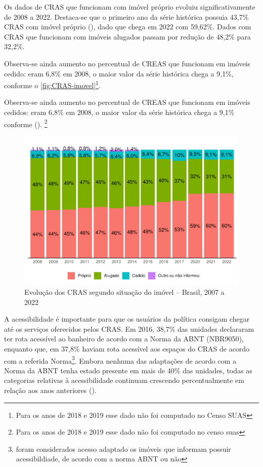 \documentclass[
  brazilian]{report}
\begin{document}
Os dados de CRAS que funcionam com imóvel próprio evoluiu
significativamente de 2008 a 2022. Destaca-se que o primeiro ano da
série histórica possuia 43,7\% CRAS com imóvel próprio
(), dado que chega em 2022 com 59,62\%. Dados com
CRAS que funcionam com imóveis alugados passam por redução de 48,2\%
para 32,2\%.

Observa-se ainda aumento no percentual de CREAS que funcionam em imóveis
cedido: eram 6,8\% em 2008, o maior valor da série histórica chega a
9,1\%, conforme o
\cref{fig:CRAS-imovel}\footnote{Para os anos de 2018 e 2019 esse dado não foi computado no Censo SUAS}.

Observa-se ainda aumento no percentual de CREAS que funcionam em imóveis
cedidos: eram 6,8\% em 2008, o maior valor da série histórica chega a
9,1\% conforme ().
\footnote{Para os anos de 2018 e 2019 esse dado não foi computado no censo suas}

\begin{figure}
\includegraphics{Censo-SUAS-2022_files/figure-latex/sit_imovel-1} \caption[Evolução dos CRAS segundo situação do imóvel – Brasil, 2007 a 2022]{Evolução dos CRAS segundo situação do imóvel – Brasil, 2007 a 2022}\label{fig:sit_imovel}
\end{figure}

A acessibilidade é importante para que os usuários da política consigam
chegar até os serviços oferecidos pelos CRAS. Em 2016, 38,7\% das
unidades declararam ter rota acessível ao banheiro de acordo com a Norma
da ABNT (NBR9050), enquanto que, em 37,8\% haviam rota acessível aos
espaços do CRAS de acordo com a referida
Norma\footnote{foram considerados acesso adaptado os imóveis que informam possuir acessibildiade, de acordo com a norma ABNT ou não}.
Embora nenhuma das adaptações de acordo com a Norma da ABNT tenha estado
presente em mais de 40\% das unidades, todas as categorias relativas à
acessibilidade continuam crescendo percentualmente em relação aos anos
anteriores ().
\end{document}
